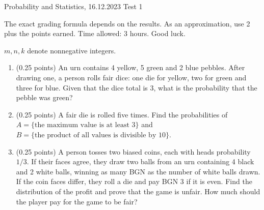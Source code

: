 \documentclass[a4paper]{report}
\begin{document}
\noindent Probability and Statistics, 16.12.2023 \hfill Test 1

\hrulefill

\begin{it}
The exact grading formula depends on the results. As an approximation, use 2 plus the points earned. Time allowed: 3 hours. Good luck.

$m,n,k$ denote nonnegative integers.



\end{it}

\begin{problem}
    \begin{enumerate}
        \item (0.25 points) An urn contains 4 yellow, 5 green and 2 blue pebbles. After drawing one, a person rolls fair dice: one die for yellow, two for green and three for blue. Given that the dice total is 3, what is the probability that the pebble was green?

        \item (0.25 points)
        A fair die is rolled five times. Find the probabilities of\\
        \(A=\{\text{the maximum value is at least 3}\}\) and\\ \(B=\{\text{the product of all values is divisible by 10}\}\).


    \item (0.25 points)
    A person tosses two biased coins, each with heads probability \(1/3\). If their faces agree, they draw two balls from an urn containing 4 black and 2 white balls, winning as many BGN as the number of white balls drawn. If the coin faces differ, they roll a die and pay BGN 3 if it is even. Find the distribution of the profit and prove that the game is unfair. How much should the player pay for the game to be fair?

    \end{enumerate}
\end{problem}
\end{document}

